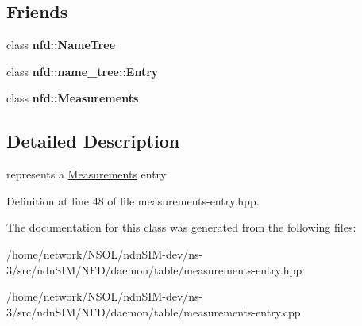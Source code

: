 \subsection*{Friends}
\begin{DoxyCompactItemize}
\item 
class {\bfseries nfd\+::\+Name\+Tree}\hypertarget{classnfd_1_1measurements_1_1Entry_a6c9695e8b2951b18e0243f6b40a26735}{}\label{classnfd_1_1measurements_1_1Entry_a6c9695e8b2951b18e0243f6b40a26735}

\item 
class {\bfseries nfd\+::name\+\_\+tree\+::\+Entry}\hypertarget{classnfd_1_1measurements_1_1Entry_a79163783eb509656535bce49e536ba56}{}\label{classnfd_1_1measurements_1_1Entry_a79163783eb509656535bce49e536ba56}

\item 
class {\bfseries nfd\+::\+Measurements}\hypertarget{classnfd_1_1measurements_1_1Entry_af5b3b54fd5a2bbf837c1800428c2cff5}{}\label{classnfd_1_1measurements_1_1Entry_af5b3b54fd5a2bbf837c1800428c2cff5}

\end{DoxyCompactItemize}


\subsection{Detailed Description}
represents a \hyperlink{classnfd_1_1Measurements}{Measurements} entry 

Definition at line 48 of file measurements-\/entry.\+hpp.



The documentation for this class was generated from the following files\+:\begin{DoxyCompactItemize}
\item 
/home/network/\+N\+S\+O\+L/ndn\+S\+I\+M-\/dev/ns-\/3/src/ndn\+S\+I\+M/\+N\+F\+D/daemon/table/measurements-\/entry.\+hpp\item 
/home/network/\+N\+S\+O\+L/ndn\+S\+I\+M-\/dev/ns-\/3/src/ndn\+S\+I\+M/\+N\+F\+D/daemon/table/measurements-\/entry.\+cpp\end{DoxyCompactItemize}
